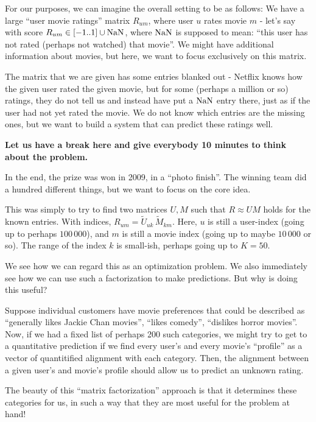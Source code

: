 \documentclass[11pt]{article}
\begin{document}
For our purposes, we can imagine the overall setting to be as follows:
We have a large ``user movie ratings'' matrix \(R_{um}\), where user
\(u\) rates movie \(m\) - let's say with score
\(R_{um}\in [-1.. 1] \cup {\rm NaN}\), where \({\rm NaN}\) is supposed
to mean: ``this user has not rated (perhaps not watched) that movie''.
We might have additional information about movies, but here, we want to
focus exclusively on this matrix.

The matrix that we are given has some entries blanked out - Netflix
knows how the given user rated the given movie, but for some (perhaps a
million or so) ratings, they do not tell us and instead have put a
\({\rm NaN}\) entry there, just as if the user had not yet rated the
movie. We do not know which entries are the missing ones, but we want to
build a system that can predict these ratings well.

\textbf{Let us have a break here and give everybody 10 minutes to think
about the problem.}

In the end, the prize was won in 2009, in a ``photo finish''. The
winning team did a hundred different things, but we want to focus on the
core idea.

This was simply to try to find two matrices \(U, M\) such that
\(R\approx UM\) holds for the known entries. With indices,
\(R_{um}=\tilde U_{uk}\,\tilde M_{km}\). Here, \(u\) is still a
user-index (going up to perhaps \(100\,000\)), and \(m\) is still a
movie index (going up to maybe \(10\,000\) or so). The range of the
index \(k\) is small-ish, perhaps going up to \(K=50\).

We see how we can regard this as an optimization problem. We also
immediately see how we can use such a factorization to make predictions.
But why is doing this useful?

Suppose individual customers have movie preferences that could be
described as ``generally likes Jackie Chan movies'', ``likes comedy'',
``dislikes horror movies''. Now, if we had a fixed list of perhaps 200
such categories, we might try to get to a quantitative prediction if we
find every user's and every movie's ``profile'' as a vector of
quantitified alignment with each category. Then, the alignment between a
given user's and movie's profile should allow us to predict an unknown
rating.

The beauty of this ``matrix factorization'' approach is that it
determines these categories for us, in such a way that they are most
useful for the problem at hand!
\end{document}
